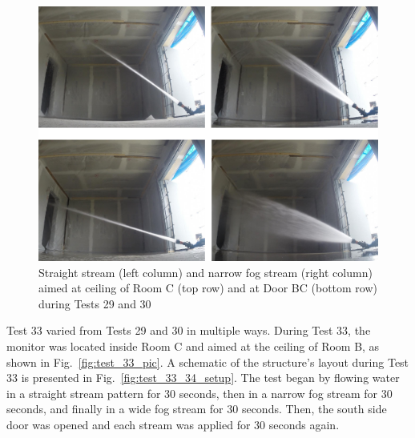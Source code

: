 \documentclass[12pt,oneside]{book}
\begin{document}
\begin{figure}[!ht]
\includegraphics[width=6in]{../Pictures/East_monitor_C_BC.pdf}
\caption[Straight Stream and Narrow Fog Stream during Tests 29 and 30]{Straight stream (left column) and narrow fog stream (right column) aimed at ceiling of Room C (top row) and at Door BC (bottom row) during Tests 29 and 30}
\label{fig:test_29_30_pic}
\end{figure}
\FloatBarrier

Test 33 varied from Tests 29 and 30 in multiple ways. During Test 33, the monitor was located inside Room C and aimed at the ceiling of Room B, as shown in Fig.~\ref{fig:test_33_pic}. A schematic of the structure's layout during Test 33 is presented in Fig.~\ref{fig:test_33_34_setup}. The test began by flowing water in a straight stream pattern for 30 seconds, then in a narrow fog stream for 30 seconds, and finally in a wide fog stream for 30 seconds. Then, the south side door was opened and each stream was applied for 30 seconds again.
\end{document}
